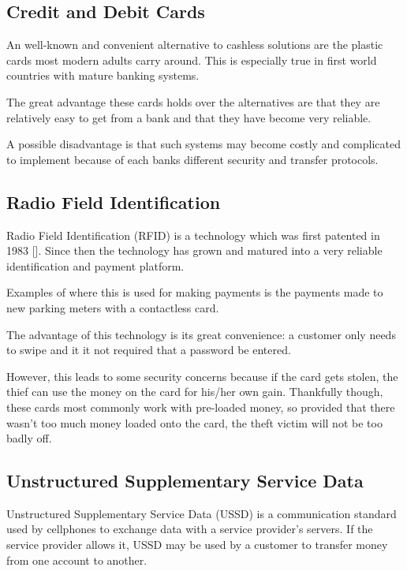 \subsection{Credit and Debit Cards}

An well-known and convenient alternative to cashless solutions are the plastic cards most
modern adults carry around. This is especially true in first world countries with mature
banking systems. 

The great advantage these cards holds over the alternatives are that they are
relatively easy to get from a bank and that they have become very reliable. 

A possible disadvantage is that such systems may become costly and complicated to implement
because of each banks different security and transfer protocols.

\subsection{Radio Field Identification}

Radio Field Identification (RFID) is a technology which was first patented in 1983
[\cite{patent:nfc-patent}]. Since then the technology has grown and matured into a very
reliable identification and payment platform. 

Examples of where this is used for making payments is the payments made to new parking meters
with a contactless card. 

The advantage of this technology is its great convenience: a customer only needs to swipe and
it it not required that a password be entered.

However, this leads to some security concerns because if the card gets stolen, the thief can
use the money on the card for his/her own gain. Thankfully though, these cards most commonly
work with pre-loaded money, so provided that there wasn't too much money loaded onto the card,
the theft victim will not be too badly off. 

\subsection{Unstructured Supplementary Service Data}

Unstructured Supplementary Service Data (USSD) is a communication standard used by cellphones
to exchange data with a service provider's servers. If the service provider allows it, USSD may
be used by a customer to transfer money from one account to another. 

